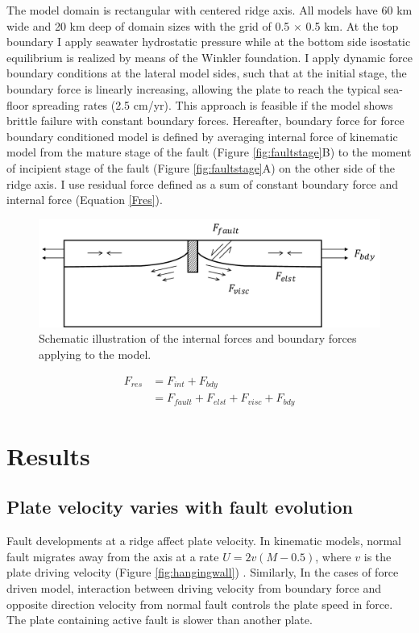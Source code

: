 \documentclass[letterpaper,12pt,notitle]{memphisthesis}                     %
\begin{document}
The model domain is rectangular with centered ridge axis. All models have 60 km wide and 20 km deep of domain sizes with the grid of 0.5 $\times$ 0.5 km. At the top boundary I apply seawater hydrostatic pressure while at the bottom side isostatic equilibrium is realized by means of the Winkler foundation. I apply dynamic force boundary conditions at the lateral model sides, such that at the initial stage, the boundary force is linearly increasing, allowing the plate to reach the typical sea-floor spreading rates (2.5 cm/yr). This approach is feasible if the model shows brittle failure with constant boundary forces. Hereafter, boundary force for force boundary conditioned model is defined by averaging internal force of kinematic model from the mature stage of the fault (Figure \ref{fig:faultstage}B) to the moment of incipient stage of the fault (Figure \ref{fig:faultstage}A) on the other side of the ridge axis. I use residual force defined as a sum of constant boundary force and internal force (Equation \ref{Fres}).

\begin{figure}[!htb]
	\centering
	\includegraphics[width=0.9\linewidth]{./figs/force.pdf}
	\caption{ Schematic illustration of the internal forces and boundary forces applying to the model.}
	\label{fig:forcescheme}
\end{figure}
\begin{align} \label{Fres}
F_{res} & = F_{int} + F_{bdy} \\
 & = F_{fault} + F_{elst} + F_{visc} + F_{bdy}
\end{align}

\chapter{Results}

\section{Plate velocity varies with fault evolution}

Fault developments at a ridge affect plate velocity. In kinematic models, normal fault migrates away from the axis at a rate $U = 2v(M-0.5)$, where $v$ is the plate driving velocity (Figure \ref{fig:hangingwall}) \citep{Buck2005}. Similarly, In the cases of force driven model, interaction between driving velocity from boundary force and opposite direction velocity from normal fault controls the plate speed in force. The plate containing active fault is slower than another plate.
\end{document}
